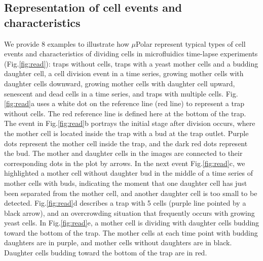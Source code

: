 \documentclass[conference]{IEEEtran}
\begin{document}
\subsection{Representation of cell events and characteristics}
We provide 8 examples to illustrate how $\mu$Polar  represent typical types of cell events and characteristics of dividing cells in microfluidics time-lapse experiments (Fig.\ref{fig:read}): traps without cells, traps with a yeast mother cells and a budding daughter cell, a cell division event in a time series,  growing mother cells with daughter cells downward, growing mother cells with daughter cell upward,  senescent and dead cells in a time series, and traps with multiple cells. 
Fig.\ref{fig:read}a uses a white dot on the reference line (red line) to represent a trap without cells. The red reference line is defined here at the bottom of the trap.
The event in Fig.\ref{fig:read}b portrays
the initial stage after division occurs, where the mother cell is located inside the trap with a bud at the trap outlet.  Purple dots represent the mother cell inside the trap, and the dark red dots represent the bud. The mother and daughter cells in the images are connected to their corresponding dots in the plot by arrows. In the next event Fig.\ref{fig:read}c, we highlighted a mother cell without daughter bud in the middle of a time series of mother cells with buds, indicating the moment that one daughter cell has just been separated from the mother cell, and another daughter cell is too small to be detected. 
Fig.\ref{fig:read}d describes a trap with 5 cells (purple line pointed by a black arrow), and an overcrowding situation that frequently occurs with growing yeast cells.
In Fig.\ref{fig:read}e, a mother cell is dividing with daughter cells budding toward the bottom of the trap. The mother cells at each time point with budding daughters are in purple, and mother cells without daughters are in black. Daughter cells budding toward the bottom of the trap are in red. 
\end{document}
